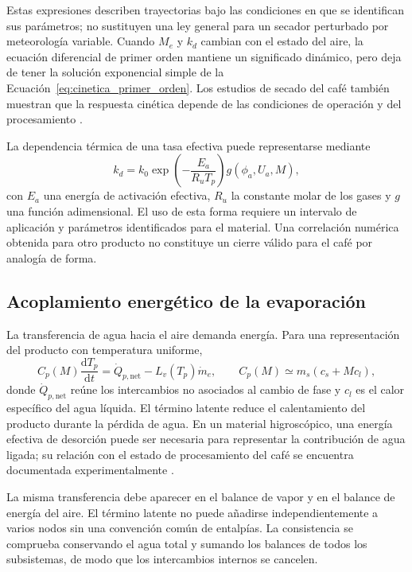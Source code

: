 Estas expresiones describen trayectorias bajo las condiciones en que se identifican sus parámetros; no sustituyen una ley general para un secador perturbado por meteorología variable. Cuando $M_e$ y $k_d$ cambian con el estado del aire, la ecuación diferencial de primer orden mantiene un significado dinámico, pero deja de tener la solución exponencial simple de la Ecuación~\eqref{eq:cinetica_primer_orden}. Los estudios de secado del café también muestran que la respuesta cinética depende de las condiciones de operación y del procesamiento \cite{alves2017}.

La dependencia térmica de una tasa efectiva puede representarse mediante
\begin{equation}
k_d=k_0\exp\left(-\frac{E_a}{R_uT_p}\right)
g(\phi_a,U_a,M),
\label{eq:arrhenius_secado}
\end{equation}
con $E_a$ una energía de activación efectiva, $R_u$ la constante molar de los gases y $g$ una función adimensional. El uso de esta forma requiere un intervalo de aplicación y parámetros identificados para el material. Una correlación numérica obtenida para otro producto no constituye un cierre válido para el café por analogía de forma.

\subsection{Acoplamiento energético de la evaporación}

La transferencia de agua hacia el aire demanda energía. Para una representación del producto con temperatura uniforme,
\begin{equation}
C_p(M)\frac{\mathrm{d}T_p}{\mathrm{d}t}
=\dot Q_{p,\mathrm{net}}-L_v(T_p)\dot m_e,
\qquad
C_p(M)\simeq m_s(c_s+Mc_l),
\label{eq:energia_producto}
\end{equation}
donde $\dot Q_{p,\mathrm{net}}$ reúne los intercambios no asociados al cambio de fase y $c_l$ es el calor específico del agua líquida. El término latente reduce el calentamiento del producto durante la pérdida de agua. En un material higroscópico, una energía efectiva de desorción puede ser necesaria para representar la contribución de agua ligada; su relación con el estado de procesamiento del café se encuentra documentada experimentalmente \cite{correa2010}.

La misma transferencia debe aparecer en el balance de vapor y en el balance de energía del aire. El término latente no puede añadirse independientemente a varios nodos sin una convención común de entalpías. La consistencia se comprueba conservando el agua total y sumando los balances de todos los subsistemas, de modo que los intercambios internos se cancelen.

